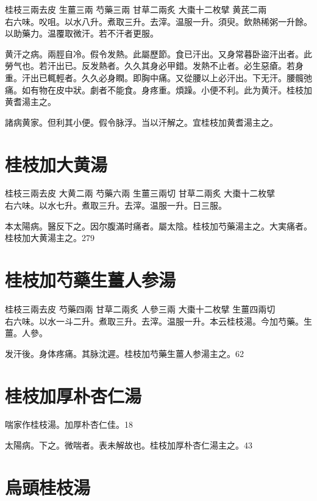 \documentclass[b5paper,twoside,zihao=-4,UTF8]{ctexbook}
\begin{document}
桂枝{\scriptsize 三兩去皮} 生薑{\scriptsize 三兩} 芍藥{\scriptsize 三兩} 甘草{\scriptsize 二兩炙} 大棗{\scriptsize 十二枚擘} 黄芪{\scriptsize 二兩}\\
右六味。㕮咀。以水八升。煮取三升。去滓。温服一升。須臾。飲熱稀粥一升餘。以助藥力。温覆取微汗。若不汗者更服。

黄汗之病。兩脛自冷。假令发熱。此屬歷節。食已汗出。又身常暮{卧}盜汗出者。此勞气也。若汗出已。反发熱者。久久其身必甲錯。发熱不止者。必生惡瘡。若身重。汗出已輒輕者。久久必身瞤。即胸中痛。又從腰以上必汗出。下无汗。腰髖弛痛。如有物在皮中狀。劇者不能食。身疼重。煩躁。小便不利。此为黄汗。桂枝加黄耆湯主之。

諸病黄家。但利其小便。假令脉浮。当以汗解之。宜桂枝加黄耆湯主之。

\section{桂枝加大黄湯}

桂枝{\scriptsize 三兩去皮} 大黄{\scriptsize 二兩} 芍藥{\scriptsize 六兩} 生薑{\scriptsize 三兩切} 甘草{\scriptsize 二兩炙} 大棗{\scriptsize 十二枚擘}\\
右六味。以水七升。煮取三升。去滓。温服一升。日三服。

{本}太陽病。醫反下之。因尔腹滿时痛者。屬太陰。桂枝加芍藥湯主之。大実痛者。桂枝加大黄湯主之。279

\section{桂枝加芍藥生薑人参湯}

桂枝{\scriptsize 三兩去皮} 芍藥{\scriptsize 四兩} 甘草{\scriptsize 二兩炙} 人參{\scriptsize 三兩} 大棗{\scriptsize 十二枚擘} 生薑{\scriptsize 四兩切}\\
右六味。以水一斗二升。煮取三升。去滓。温服一升。本云桂枝湯。今加芍藥。生薑。人參。

发汗後。身体疼痛。其脉沈遲。桂枝加芍藥生薑人参湯主之。62

\section{桂枝加厚朴杏仁湯}

喘家作桂枝湯。加厚朴杏仁佳。18

太陽病。下之。微喘者。表未解故也。桂枝{加厚朴杏仁}湯主之。43

\section{烏頭桂枝湯}
\end{document}
